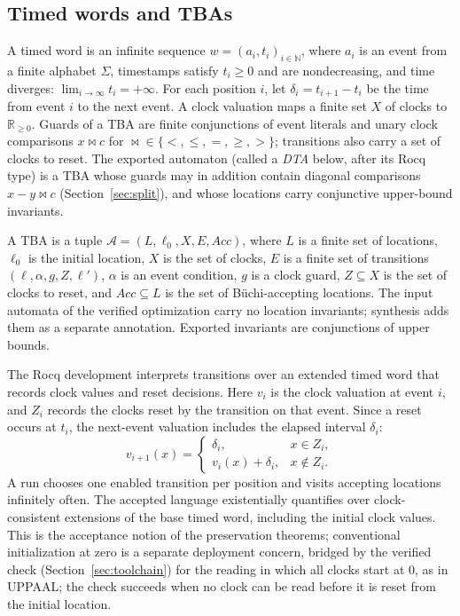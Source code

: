 \documentclass[preprint,12pt]{elsarticle}
\let\pathfragile\path
\DeclareRobustCommand\path{\pathfragile}
\providecommand{\Nat}{\mathbb{N}}
\providecommand{\Real}{\mathbb{R}}
\begin{document}
\subsection{Timed words and TBAs}
A timed word is an infinite sequence $w=(a_i,t_i)_{i\in\Nat}$, where $a_i$ is an event from a finite alphabet $\Sigma$, timestamps satisfy $t_i\ge0$ and are nondecreasing, and time diverges: $\lim_{i\to\infty}t_i=+\infty$. For each position $i$, let $\delta_i=t_{i+1}-t_i$ be the time from event $i$ to the next event. A clock valuation maps a finite set $X$ of clocks to $\Real_{\ge0}$. Guards of a TBA are finite conjunctions of event literals and unary clock comparisons $x\bowtie c$ for $\bowtie\in\{<,\le,=,\ge,>\}$; transitions also carry a set of clocks to reset. The exported automaton (called a \emph{DTA} below, after its Rocq type) is a TBA whose guards may in addition contain diagonal comparisons $x-y\bowtie c$ (Section~\ref{sec:split}), and whose locations carry conjunctive upper-bound invariants.

A TBA is a tuple $\mathcal A=(L,\ell_0,X,E,\mathit{Acc})$, where $L$ is a finite set of locations, $\ell_0$ is the initial location, $X$ is the set of clocks, $E$ is a finite set of transitions $(\ell,\alpha,g,Z,\ell')$, $\alpha$ is an event condition, $g$ is a clock guard, $Z\subseteq X$ is the set of clocks to reset, and $\mathit{Acc}\subseteq L$ is the set of B\"uchi-accepting locations. The input automata of the verified optimization carry no location invariants; synthesis adds them as a separate annotation. Exported invariants are conjunctions of upper bounds.

The Rocq development interprets transitions over an extended timed word that records clock values and reset decisions. Here $v_i$ is the clock valuation at event $i$, and $Z_i$ records the clocks reset by the transition on that event. Since a reset occurs at $t_i$, the next-event valuation includes the elapsed interval $\delta_i$:
\[
v_{i+1}(x)=
\begin{cases}
\delta_i,&x\in Z_i,\\
v_i(x)+\delta_i,&x\notin Z_i.
\end{cases}
\]
A run chooses one enabled transition per position and visits accepting locations infinitely often. The accepted language existentially quantifies over clock-consistent extensions of the base timed word, including the initial clock values. This is the acceptance notion of the preservation theorems; conventional initialization at zero is a separate deployment concern, bridged by the verified check  (Section~\ref{sec:toolchain}) for the reading in which all clocks start at 0, as in UPPAAL; the check succeeds when no clock can be read before it is reset from the initial location.
\end{document}

